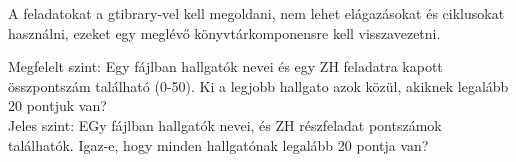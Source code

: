 \documentclass[12pt,a4paper]{article}
\begin{document}
A feladatokat a gtibrary-vel kell megoldani, nem lehet elágazásokat és ciklusokat használni, ezeket egy meglévő könyvtárkomponensre kell visszavezetni. 

Megfelelt szint: Egy fájlban hallgatók nevei és egy ZH feladatra kapott összpontszám található (0-50). Ki a legjobb hallgato azok közül, akiknek legalább 20 pontjuk van? \\

Jeles szint: EGy fájlban hallgatók nevei, és ZH részfeladat pontszámok találhatók. Igaz-e, hogy minden hallgatónak legalább 20 pontja van?
\end{document}
